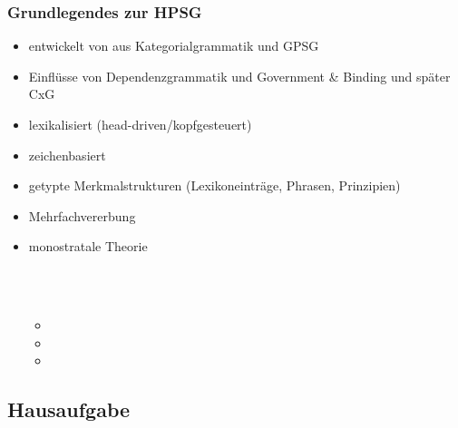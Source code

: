{{\frametitle{Grundlegendes zur HPSG}
\small
\begin{itemize}
\item entwickelt von \citet{ps,ps2}\nocite{Sag97a} aus Kategorialgrammatik und GPSG
\pause
\item Einflüsse von Dependenzgrammatik und Government \& Binding und später CxG
\pause
\item lexikalisiert (head-driven/kopfgesteuert)
\pause
\item zeichenbasiert \citep{Saussure16a}
\pause
\item getypte Merkmalstrukturen (Lexikoneinträge, Phrasen, Prinzipien)
\pause
\item Mehrfachvererbung
\pause
\item monostratale Theorie\\~\\
\begin{minipage}[t]{2.5cm}
~\\[-20mm]
\begin{itemize}
\item {}
\item {}
\item {}
\end{itemize}
\end{minipage}%
\parbox[t]{3cm}{
}
\end{itemize}
}
}%

\subsection{Hausaufgabe}

